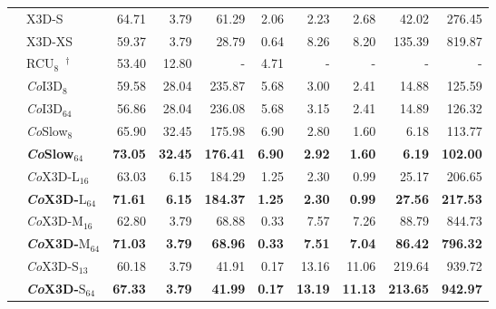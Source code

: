 \begin{table}[t]
\begin{center}
{\begin{tabular}{llrrrrrrrr}
    & X3D-S                             & 64.71     & 3.79     & 61.29     & 2.06       & 2.23   & 2.68     & 42.02     & 276.45 \\
    & X3D-XS                            & 59.37     & 3.79     & 28.79     & 0.64       & 8.26   & 8.20     & 135.39    & 819.87 \\
    \midrule
    \parbox[t]{1mm}{} & RCU$_8$~\cite{singh2019recurrent}$^\dagger$     & 53.40     & 12.80     & - & 4.71 & - & - & - & - \\
    & \textit{Co}I3D$_{8}$              & 59.58     & 28.04    & 235.87    & 5.68       & 3.00   & 2.41     & 14.88     & 125.59 \\
    & \textit{Co}I3D$_{64}$             & 56.86     & 28.04    & 236.08    & 5.68       & 3.15   & 2.41     & 14.89     & 126.32 \\
    & \textit{Co}Slow$_{8}$             & 65.90     & 32.45    & 175.98    & 6.90       & 2.80   & 1.60     & 6.18      & 113.77 \\
    & \textbf{\textit{Co}Slow$_{64}$}    & \textbf{73.05}  & \textbf{32.45}  & \textbf{176.41}  & \textbf{6.90}   & \textbf{2.92}   & \textbf{1.60}  & \textbf{6.19} & \textbf{102.00}  \\
    & \textit{Co}X3D-$\text{L}_{16}$    & 63.03     & 6.15     & 184.29    & 1.25       & 2.30   & 0.99     & 25.17     & 206.65 \\
    & \textbf{\textit{Co}X3D-$\text{L}_{64}$}    & \textbf{71.61}     & \textbf{6.15}    & \textbf{184.37}     & \textbf{1.25}      &  \textbf{2.30}   & \textbf{0.99}       & \textbf{27.56}       & \textbf{217.53}  \\
    & \textit{Co}X3D-$\text{M}_{16}$    & 62.80     & 3.79    & 68.88     & 0.33      & 7.57   & 7.26       & 88.79      & 844.73  \\
    & \textbf{\textit{Co}X3D-$\text{M}_{64}$}    & \textbf{71.03}     & \textbf{3.79}    & \textbf{68.96}    & \textbf{0.33}      & \textbf{7.51}   & \textbf{7.04}       & \textbf{86.42}      & \textbf{796.32}  \\
    & \textit{Co}X3D-$\text{S}_{13}$    & 60.18     & 3.79    & 41.91     & 0.17      & 13.16  & 11.06      & 219.64      & 939.72 \\
    & \textbf{\textit{Co}X3D-$\text{S}_{64}$}    & \textbf{67.33}     & \textbf{3.79}    & \textbf{41.99}     & \textbf{0.17}      & \textbf{13.19}  & \textbf{11.13}     & \textbf{213.65}      & \textbf{942.97} \\

\end{tabular}}
\end{center}
\end{table}
